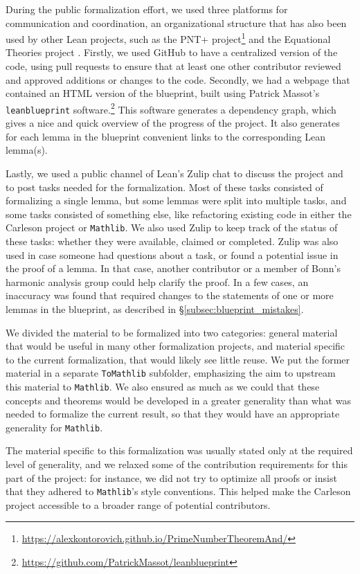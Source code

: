 \documentclass[12pt, reqno]{amsart}
\newcommand{\mathlib}{\texttt{Mathlib}\xspace}
\theoremstyle{definition}
\theoremstyle{plain}
\begin{document}
During the public formalization effort, we used three platforms for communication and coordination,
an organizational structure that has also been used by other Lean projects,
such as the PNT$+$ project\footnote{\url{https://alexkontorovich.github.io/PrimeNumberTheoremAnd/}}
and the Equational Theories project \cite{tao2025equationaltheories}.
Firstly, we used GitHub to have a centralized version of the code,
using pull requests to ensure that at least one other contributor reviewed and approved additions or changes to the code.
Secondly, we had a webpage that contained an HTML version of the blueprint,
built using Patrick Massot's \texttt{leanblueprint} software.\footnote{\url{https://github.com/PatrickMassot/leanblueprint}}
This software generates a dependency graph, which gives a nice and quick overview of the progress of the project.
It also generates for each lemma in the blueprint convenient links to the corresponding Lean lemma(s).

Lastly, we used a public channel of Lean's Zulip chat to discuss the project and to post tasks needed for the formalization.
Most of these tasks consisted of formalizing a single lemma,
but some lemmas were split into multiple tasks, and some tasks consisted of something else,
like refactoring existing code in either the Carleson project or \mathlib.
We also used Zulip to keep track of the status of these tasks:
whether they were available, claimed or completed.
Zulip was also used in case someone had questions about a task,
or found a potential issue in the proof of a lemma.
In that case, another contributor or a member of Bonn's harmonic analysis group could help clarify the proof.
In a few cases, an inaccuracy was found that required changes to the statements of one or more lemmas in the blueprint,
as described in \S\ref{subsec:blueprint_mistakes}.

We divided the material to be formalized into two categories:
general material that would be useful in many other formalization projects,
and material specific to the current formalization, that would likely see little reuse.
We put the former material in a separate \texttt{ToMathlib} subfolder,
emphasizing the aim to upstream this material to \mathlib.
We also ensured as much as we could that these concepts and theorems would be developed in a greater generality than what was needed to formalize the current result, so that they would have an appropriate generality for \mathlib.

The material specific to this formalization was usually stated only at the required level of generality, and we relaxed some of the contribution requirements for this part of the project: for instance, we did not try to optimize all proofs or insist that they adhered to \mathlib's style conventions.
This helped make the Carleson project accessible to a broader range of potential contributors.
\end{document}

